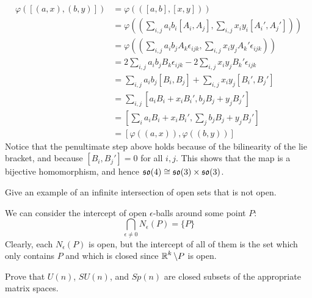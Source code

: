 \documentclass[12pt,onecolumn]{article}
\begin{document}
\begin{answer}
\begin{align*}
    \varphi([(a,x),(b,y)]) &= \varphi(([a,b],[x,y])) \\
    &=\varphi((\sum_{i,j} a_ib_i[A_i,A_j],\sum_{i,j} x_iy_i[A_i',A_j'])) \\
    &= \varphi((\sum_{i,j} a_ib_j A_k \epsilon_{ijk}, \sum_{i,j} x_iy_jA_k'\epsilon_{ijk})) \\
    &= 2\sum_{i,j} a_ib_jB_k\epsilon_{ijk} - 2\sum_{i,j} x_iy_jB_k' \epsilon_{ijk} \\
    &=\sum_{i,j} a_ib_j[B_i,B_j] + \sum_{i,j} x_iy_j[B_i',B_j'] \\ 
    &= \sum_{i,j}[a_iB_i+ x_iB_i',b_jB_j+y_jB_j'] \\
    &= [\sum_i a_iB_i+x_iB_i', \sum_j b_jB_j+y_jB_j'] \\
    &= [\varphi((a,x)),\varphi((b,y))]
\end{align*}
Notice that the penultimate step above holds because of the bilinearity of the lie bracket, and because $[B_i,B_j']=0$ for all $i,j$. This shows that the map is a bijective homomorphism, and hence $\operatorname{\mathfrak{so}}(4) \cong \operatorname{\mathfrak{so}}(3) \times \operatorname{\mathfrak{so}}(3)$.
\end{answer}
\begin{exercise}[8.1.3]
Give an example of an infinite intersection of open sets that is not open. 
\end{exercise}
\begin{answer}
We can consider the intercept of open $\epsilon$-balls around some point $P$:
\[
\bigcap_{\epsilon \neq 0} N_\epsilon(P) = \{ P\}
\]
Clearly, each $N_{\epsilon}(P)$ is open, but the intercept of all of them is the set which only contains $P$ and which is closed since $\operatorname{\mathbb{R}}^k \setminus P$ is open.
\end{answer}
\begin{exercise}[8.2.1]
 Prove that $U(n)$, $SU(n)$, and $Sp(n)$ are closed subsets of the appropriate matrix spaces. 
\end{exercise}
\end{document}
